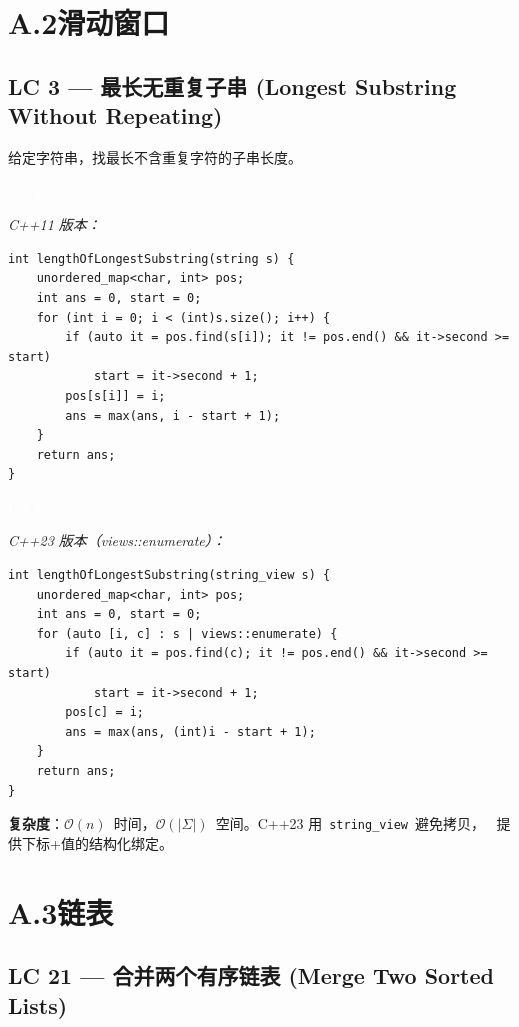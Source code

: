 \documentclass[12pt,a4paper,fontset=fandol]{ctexbook}
\newcommand{\cpplabel}{%
  \noindent\begin{tcolorbox}[sharp corners,colback=cppheadbg,colframe=cppheadbg,
    left=6pt,right=6pt,top=2pt,bottom=2pt,boxrule=0pt]
  \textcolor{white}{\small\bfseries\sffamily C++}\end{tcolorbox}%
}
\newcommand{\bigO}[1]{\mathcal{O}(#1)}
\begin{document}
\section*{A.2\quad 滑动窗口}

\subsection*{LC 3 — 最长无重复子串 (Longest Substring Without Repeating)}

给定字符串，找最长不含重复字符的子串长度。

\cpplabel\noindent\textit{C++11 版本：}
\begin{lstlisting}[style=cppstyle]
int lengthOfLongestSubstring(string s) {
    unordered_map<char, int> pos;
    int ans = 0, start = 0;
    for (int i = 0; i < (int)s.size(); i++) {
        if (auto it = pos.find(s[i]); it != pos.end() && it->second >= start)
            start = it->second + 1;
        pos[s[i]] = i;
        ans = max(ans, i - start + 1);
    }
    return ans;
}
\end{lstlisting}

\cpplabel\noindent\textit{C++23 版本（views::enumerate）：}
\begin{lstlisting}[style=cppstyle]
int lengthOfLongestSubstring(string_view s) {
    unordered_map<char, int> pos;
    int ans = 0, start = 0;
    for (auto [i, c] : s | views::enumerate) {
        if (auto it = pos.find(c); it != pos.end() && it->second >= start)
            start = it->second + 1;
        pos[c] = i;
        ans = max(ans, (int)i - start + 1);
    }
    return ans;
}
\end{lstlisting}
\textbf{复杂度}：$\bigO{n}$~时间，$\bigO{|\Sigma|}$~空间。C++23 用~\texttt{string\_view}~避免拷贝，
\texttt{}~提供下标+值的结构化绑定。

\section*{A.3\quad 链表}

\subsection*{LC 21 — 合并两个有序链表 (Merge Two Sorted Lists)}
\end{document}
